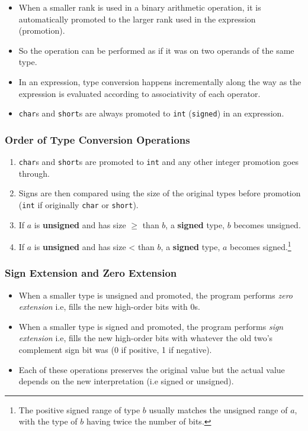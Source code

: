 \documentclass{article}
\newcommand{\code}[1]{\texttt{#1}}
\begin{document}
\begin{itemize}
    \item When a smaller rank is used in a binary arithmetic operation, it is automatically promoted to the larger rank used in the expression (promotion).
    \item So the operation can be performed as if it was on two operands of the same type.
    \item In an expression, type conversion happens incrementally along the way as the expression is evaluated according to associativity of each operator.
    \item \code{char}s and \code{short}s are always promoted to \code{int} (\code{signed}) in an expression.
\end{itemize}

\subsubsection{Order of Type Conversion Operations}

\begin{enumerate}
    \item \code{char}s and \code{short}s are promoted to \code{int} and any other integer promotion goes through.
    \item Signs are then compared using the size of the original types before promotion (\code{int} if originally \code{char} or \code{short}).
    \item If $a$ is \textbf{unsigned} and has size $\geq$ than $b$, a \textbf{signed} type, $b$ becomes unsigned.
    \item If $a$ is \textbf{unsigned} and has size < than $b$, a \textbf{signed} type, $a$ becomes signed.\footnote{The positive signed range of type $b$ usually matches the unsigned range of $a$, with the type of $b$ having twice the number of bits.}
\end{enumerate}

\subsubsection{Sign Extension and Zero Extension}

\begin{itemize}
    \item When a smaller type is unsigned and promoted, the program performs \emph{zero extension} i.e, fills the new high-order bits with 0s.
    \item When a smaller type is signed and promoted, the program performs \emph{sign extension} i.e, fills the new high-order bits with whatever the old two's complement sign bit was (0 if positive, 1 if negative).
    \item Each of these operations preserves the original value but the actual value depends on the new interpretation (i.e signed or unsigned).
\end{itemize}
\end{document}
